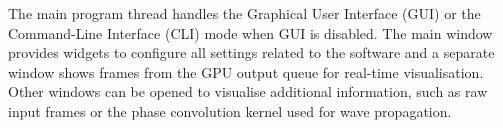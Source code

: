 The main program thread handles the Graphical User Interface (GUI) or the Command-Line Interface (CLI) mode when GUI is disabled. The main window provides widgets to configure all settings related to the software and a separate window shows frames from the GPU output queue for real-time visualisation. Other windows can be opened to visualise additional information, such as raw input frames or the phase convolution kernel used for wave propagation.